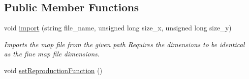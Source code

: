 \subsection*{Public Member Functions}
\begin{DoxyCompactItemize}
\item 
void \hyperlink{class_reproduction_map_a144d2f39ff2e978acd9d2ebcb6f8dc97}{import} (string file\+\_\+name, unsigned long size\+\_\+x, unsigned long size\+\_\+y)
\begin{DoxyCompactList}\small\item\em Imports the map file from the given path Requires the dimensions to be identical as the fine map file dimensions. \end{DoxyCompactList}\item 
void \hyperlink{class_reproduction_map_afc0419bc78ce9a4813212360c67b49a2}{set\+Reproduction\+Function} ()\hypertarget{class_reproduction_map_afc0419bc78ce9a4813212360c67b49a2}{}\label{class_reproduction_map_afc0419bc78ce9a4813212360c67b49a2}


\end{DoxyCompactItemize}
